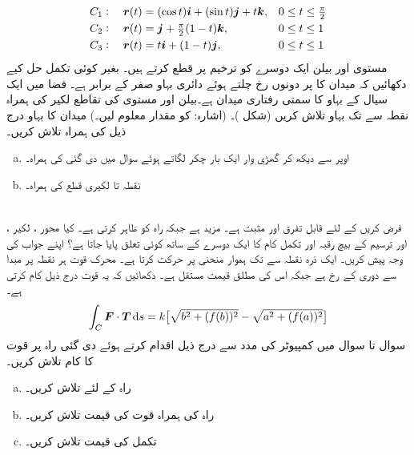 \begin{align*}
C_1:\quad {\ensuremath{{\boldsymbol{r}}}}(t)&=(\cos t){\boldsymbol{i}}+(\sin t){\boldsymbol{j}}+t{\boldsymbol{k}},&& 0\le t\le \tfrac{\pi}{2}\\
C_2:\quad {\ensuremath{{\boldsymbol{r}}}}(t)&={\boldsymbol{j}}+\tfrac{\pi}{2}(1-t){\boldsymbol{k}},&& 0\le t\le 1\\
C_3:\quad {\ensuremath{{\boldsymbol{r}}}}(t)&=t{\boldsymbol{i}}+(1-t){\boldsymbol{j}},&& 0\le t\le 1
\end{align*}
مستوی  اور بیلن  ایک دوسرے کو ترخیم  پر قطع کرتے ہیں۔ بغیر کوئی تکمل  حل کیے   دکھائیں کہ میدان  کا  پر دونوں رخ چلتے ہوئے دائری بہاو صفر کے برابر ہے۔
فضا میں ایک سیال کے بہاو کا سمتی رفتاری میدان  ہے۔بیلن  اور مستوی  کی تقاطع لکیر کی ہمراہ نقطہ  سے  تک  بہاو تلاش کریں (شکل )۔ (اشارہ:  کو مقدار معلوم لیں۔)
میدان  کا بہاو درج ذیل کی ہمراہ تلاش کریں۔
\begin{enumerate}[a.]
\item
اوپر سے دیکھ کر گھڑی وار ایک بار چکر لگاتے ہوئے سوال  میں دی گئی  کی ہمراہ۔
\item
نقطہ  تا  لکیری قطع کی ہمراہ۔

\end{enumerate}
\\
فرض کریں   کے لئے  قابل تفرق اور مثبت ہے۔ مزید  ہے جبکہ  راہ    کو  ظاہر کرتی ہے۔ کیا محور ، لکیر ،  اور ترسیم  کے بیچ رقبہ اور  تکمل کام   کا  ایک دوسرے کے ساتھ  کوئی تعلق پایا جاتا ہے؟ اپنے جواب کی وجہ پیش کریں۔
ایک ذرہ نقطہ  سے  تک ہموار منحنی  پر حرکت کرتا ہے۔ محرک قوت ہر نقطہ پر مبدا سے دوری کے رخ ہے  جبکہ اس کی مطلق قیمت  مستقل  ہے۔ دکھائیں کہ یہ قوت درج ذیل کام کرتی ہے۔
\[\int_C\kvec{F}\cdot \kvec{T}\dif s=k\big[\sqrt{b^2+(f(b))^2}-\sqrt{a^2+(f(a))^2}\big]\]  
سوال  تا سوال  میں کمپیوٹر کی مدد سے درج ذیل اقدام کرتے ہوئے دی گئی راہ پر قوت  کا کام تلاش کریں۔
\begin{enumerate}[a.]
\item
راہ  کے لئے  تلاش کریں۔
\item
راہ کی ہمراہ  قوت  کی قیمت تلاش کریں۔
\item
تکمل  کی قیمت تلاش کریں۔
\end{enumerate}

